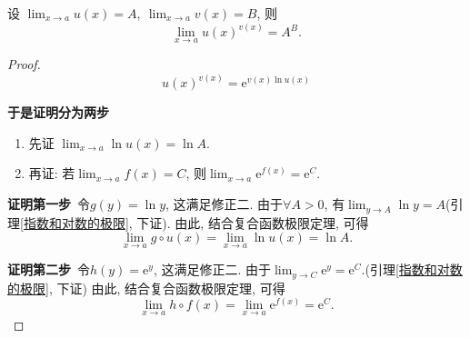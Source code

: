 \begin{proposition}
    设 $\displaystyle \lim_{x \to a} u \left( x \right) = A, \ \lim_{x \to a} v \left( x \right) = B$, 则
    \begin{equation}
        \lim_{x \to a}  u \left( x \right) ^{v \left( x \right) } = A^{B}.
    \end{equation}
\end{proposition}
\begin{proof}
    \begin{equation}
      u \left( x \right) ^{v \left( x \right) } = \mathrm{e} ^{v \left( x \right) \ln u \left( x \right) }
    \end{equation}
    
    \noindent\textbf{于是证明分为两步}
    \begin{enumerate}
        \item 先证 $\displaystyle \lim_{x \to a} \ln u \left( x \right) = \ln A$.
        \item 再证: 若$\displaystyle \lim_{x \to a} f \left( x \right) = C$, 则$\displaystyle \lim_{x \to a} \mathrm{e}^{f \left( x \right) } = \mathrm{e}^{C}$.
    \end{enumerate}

    \textbf{证明第一步}\ 
    令$g \left( y \right) = \ln y$, 这满足修正二. 由于$\forall A > 0$, 有$\displaystyle \lim_{y \to A} \ln y = A$(引理\ref{指数和对数的极限}, 下证).
    由此, 结合复合函数极限定理, 可得
    \begin{equation}
      \lim_{x \to a} g \circ u \left( x \right) = \lim_{x \to a} \ln u \left( x \right) = \ln A.
    \end{equation}

    \textbf{证明第二步}\
    令$h \left( y \right) = \mathrm{e}^{y}$, 这满足修正二. 由于$\displaystyle \lim_{y \to C} \mathrm{e}^{y} = \mathrm{e}^{C}$.(引理\ref{指数和对数的极限}, 下证)
    由此, 结合复合函数极限定理, 可得
    \begin{equation}
      \lim_{x \to a} h \circ f \left( x \right) = \lim_{x \to a} \mathrm{e}^{f \left( x \right) } = \mathrm{e}^{C}.
    \end{equation}
\end{proof}

